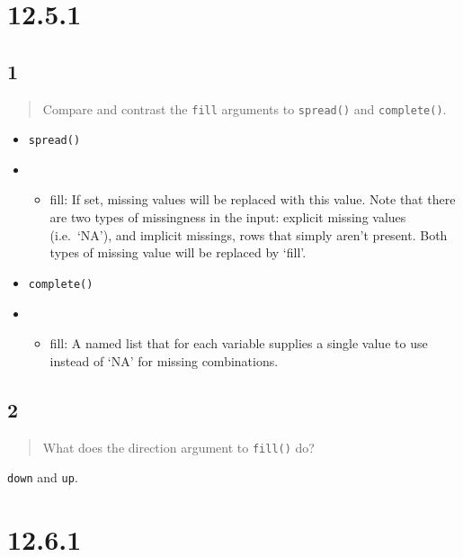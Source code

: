 \documentclass[]{ltjsarticle}
\providecommand{\tightlist}{%
  \setlength{\itemsep}{0pt}\setlength{\parskip}{0pt}}
\begin{document}
\hypertarget{section-13}{%
\section{12.5.1}\label{section-13}}

\hypertarget{section-14}{%
\subsection{1}\label{section-14}}

\begin{quote}
Compare and contrast the \texttt{fill} arguments to \texttt{spread()}
and \texttt{complete()}.
\end{quote}

\begin{itemize}
\item
  \texttt{spread()}
\item
  \begin{itemize}
  \tightlist
  \item
    fill: If set, missing values will be replaced with this value. Note
    that there are two types of missingness in the input: explicit
    missing values (i.e.~`NA'), and implicit missings, rows that simply
    aren't present. Both types of missing value will be replaced by
    `fill'.
  \end{itemize}
\item
  \texttt{complete()}
\item
  \begin{itemize}
  \tightlist
  \item
    fill: A named list that for each variable supplies a single value to
    use instead of `NA' for missing combinations.
  \end{itemize}
\end{itemize}

\hypertarget{section-15}{%
\subsection{2}\label{section-15}}

\begin{quote}
What does the direction argument to \texttt{fill()} do?
\end{quote}

\texttt{down} and \texttt{up}.

\hypertarget{section-16}{%
\section{12.6.1}\label{section-16}}
\end{document}
